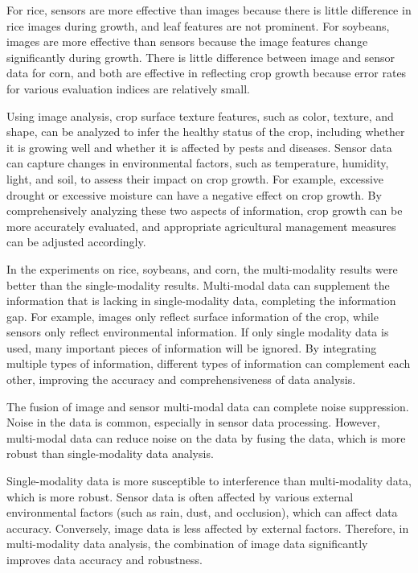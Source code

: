 \documentclass[acmsmall, screen]{acmart}
\begin{document}
For rice, sensors are more effective than images because there is little difference in rice images during growth, and leaf features are not prominent. For soybeans, images are more effective than sensors because the image features change significantly during growth. There is little difference between image and sensor data for corn, and both are effective in reflecting crop growth because error rates for various evaluation indices are relatively small. 

Using image analysis, crop surface texture features, such as color, texture, and shape, can be analyzed to infer the healthy status of the crop, including whether it is growing well and whether it is affected by pests and diseases. Sensor data can capture changes in environmental factors, such as temperature, humidity, light, and soil, to assess their impact on crop growth. For example, excessive drought or excessive moisture can have a negative effect on crop growth. By comprehensively analyzing these two aspects of information, crop growth can be more accurately evaluated, and appropriate agricultural management measures can be adjusted accordingly. 

In the experiments on rice, soybeans, and corn, the multi-modality results were better than the single-modality results. Multi-modal data can supplement the information that is lacking in single-modality data, completing the information gap. For example, images only reflect surface information of the crop, while sensors only reflect environmental information. If only single modality data is used, many important pieces of information will be ignored. By integrating multiple types of information, different types of information can complement each other, improving the accuracy and comprehensiveness of data analysis. 

The fusion of image and sensor multi-modal data can complete noise suppression. Noise in the data is common, especially in sensor data processing. However, multi-modal data can reduce noise on the data by fusing the data, which is more robust than single-modality data analysis. 

Single-modality data is more susceptible to interference than multi-modality data, which is more robust. Sensor data is often affected by various external environmental factors (such as rain, dust, and occlusion), which can affect data accuracy. Conversely, image data is less affected by external factors. Therefore, in multi-modality data analysis, the combination of image data significantly improves data accuracy and robustness. 
\end{document}
